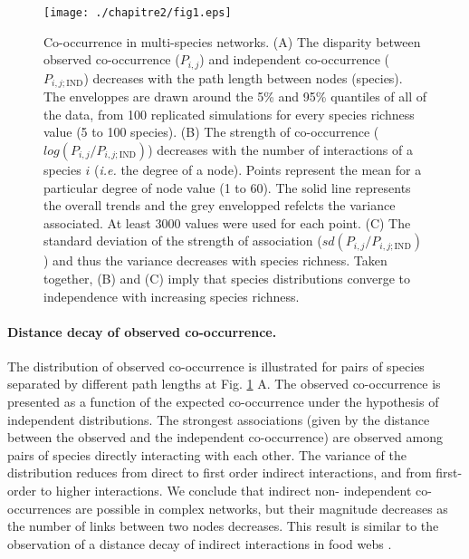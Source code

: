 \begin{figure}[h]
\texttt{[image: ./chapitre2/fig1.eps]}
\caption[Co-occurrence in multi-species networks]{Co-occurrence in multi-species networks.
(A) The disparity between observed co-occurrence ($P_{i,j}$) and independent co-occurrence ($P_{i,j;\text{IND}}$) decreases with the path length between nodes (species). The enveloppes are drawn around the 5\% and 95\% quantiles of all of the data, from 100 replicated simulations for every species richness value (5 to 100 species).
(B) The strength of co-occurrence ($log(P_{i,j}/P_{i,j;\text{IND}})$) decreases with the number of interactions of a species $i$ (\textit{i.e.} the degree of a node). Points represent the mean for a particular degree of node value (1 to 60). The solid line represents the overall trends and the grey envelopped refelcts the variance associated. At least 3000 values were used for each point.
(C) The standard deviation of the strength of association ($sd(P_{i,j}/P_{i,j;\text{IND}})$) and thus the variance decreases with species richness. Taken together, (B) and (C) imply that species distributions converge to independence with increasing species richness.}
\label{figchap2_1}
\end{figure}


\paragraph*{Distance decay of observed co-occurrence.} The distribution of
observed co-occurrence is illustrated for pairs of species separated by
different path lengths at Fig. \ref{figchap2_1} A. The observed co-occurrence is presented
as a function of the expected co-occurrence under the hypothesis of
independent distributions. The strongest associations (given by the distance
between the observed and the independent co-occurrence) are observed among
pairs of species directly interacting with each other. The variance of the
distribution reduces from direct to first order indirect interactions, and
from first-order to higher interactions. We conclude that indirect non-
independent co-occurrences are possible in complex networks, but their
magnitude decreases as the number of links between two nodes decreases. This
result is similar to the observation of a distance decay of indirect
interactions in food webs \citep{Berlow2009}.



